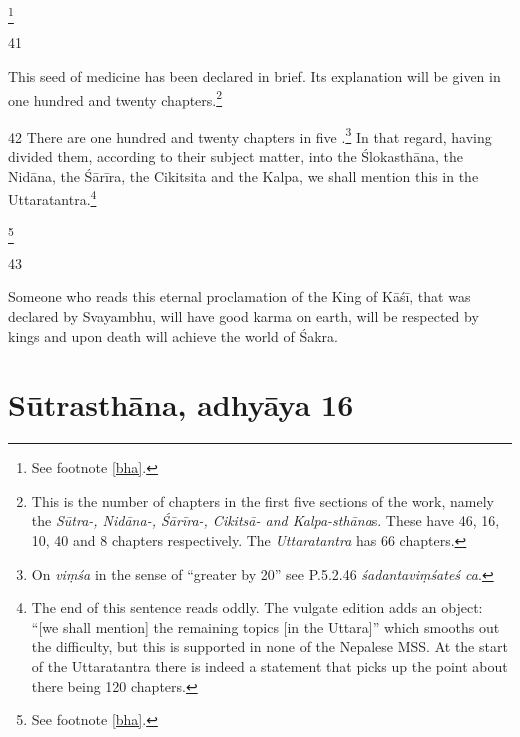 \documentclass[12pt]{article}
\let\se\saneng  %
\begin{document}
\begin{translation}
\begin{itemize}
\end{itemize}
\footnote{See footnote \ref{bha}.}

\item[41]
 
\begin{sloka}
This seed of medicine has been declared in brief.  Its explanation will be given in one 
hundred and twenty chapters.\footnote{This is the number of chapters in the first 
five sections of the work, namely the  \emph{Sūtra-, Nidāna-, Śārīra-, Cikitsā- 
\emph{and} 
Kalpa-sthāna}s. These have 46, 16, 10, 40 and 8 chapters respectively.  The 
\emph{Uttaratantra} has 66 chapters.}
\end{sloka}


\item [42] There are one hundred and twenty chapters in five
\se{adhyāya}{sections}.\footnote{On \emph{viṃśa} in the sense of “greater by 20”
see P.5.2.46 \emph{śadantaviṃśateś ca}.}  In that regard, having divided them,
according to their subject matter, into the Ślokasthāna, the Nidāna, the Śārīra,
the Cikitsita and the Kalpa, we shall mention this in the
Uttaratantra.\footnote{The end of this sentence reads oddly.  The vulgate edition
adds an object: “[we shall mention] the remaining topics [in the Uttara]” which
smooths out the difficulty, but this is supported in none of the Nepalese MSS.  At
the start of the Uttaratantra \citep[1.3--4ab]{susr-trikamji3} there is indeed a
statement that picks up the point about there being 120 chapters.}

\footnote{See footnote \ref{bha}.}

\item[43]    
    \begin{sloka}
        Someone who reads this eternal proclamation of the King of
Kāśī, that was declared by Svayambhu, will have good karma on earth, will
be respected by kings and upon death will achieve the world of Śakra.
    \end{sloka}
    
\end{translation}    
    
    \newpage
    
    \section{Sūtrasthāna, adhyāya 16}
    
\end{document}
